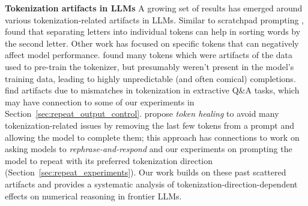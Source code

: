 \documentclass{article}
\theoremstyle{plain}
\theoremstyle{definition}
\theoremstyle{remark}
\begin{document}
\textbf{Tokenization artifacts in LLMs} A growing set of results has emerged around various tokenization-related artifacts in LLMs. Similar to scratchpad prompting \cite{nye2021scratchpad}, \citet{wei2023secondletter} found that separating letters into individual tokens can help in sorting words by the second letter. Other work \cite{shin2020autoprompt} has focused on specific tokens that can negatively affect model performance. \citet{rumbelow2023solidgoldmagikarp} found many tokens which were artifacts of the data used to pre-train the tokenizer, but presumably weren't present in the model's training data, leading to highly unpredictable (and often comical) completions. \citet{sun2023tokenization} find artifacts due to mismatches in tokenization in extractive Q\&A tasks, which may have connection to some of our experiments in Section~\ref{sec:repeat_output_control}. \citet{lundberg2023tokenhealing} propose \textit{token healing} to avoid many tokenization-related issues by removing the last few tokens from a prompt and allowing the model to complete them; this approach has connections to work on asking models to \textit{rephrase-and-respond} \cite{deng2023rephrase} and our experiments on prompting the model to repeat with its preferred tokenization direction (Section~\ref{sec:repeat_experiments}). Our work builds on these past scattered artifacts and provides a systematic analysis of tokenization-direction-dependent effects on numerical reasoning in frontier LLMs.
\end{document}
